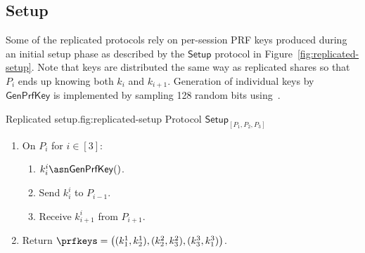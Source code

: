 \subsection{Setup}

Some of the replicated protocols rely on per-session PRF keys produced during an initial setup phase as described by the $\mathsf{Setup}$ protocol in Figure~\ref{fig:replicated-setup}. Note that keys are distributed the same way as replicated shares so that $P_i$ ends up knowing both $k_i$ and $k_{i+1}$. Generation of individual keys by $\mathsf{GenPrfKey}$ is implemented by sampling 128 random bits using~\cite{libsodium}.

\begin{Boxfig}{Replicated setup.}{fig:replicated-setup}
  {Protocol $\mathsf{Setup}_{[P_1, P_2, P_3]}$}
  
  \begin{enumerate}
  \item On $P_i$ for $i \in [3]$:
  \begin{enumerate}
    \item $k^{i}_{i} \asn \mathsf{GenPrfKey}()$.
    \item Send $k^{i}_{i}$ to $P_{i-1}$.
    \item Receive $k^{i}_{i+1}$ from $P_{i+1}$.
  \end{enumerate}
  
  \item Return $\prfkeys = \left( (k^1_1, k^1_2), (k^2_2, k^2_3), (k^3_3, k^3_1) \right)$.
  \end{enumerate}
\end{Boxfig}

